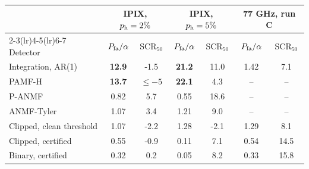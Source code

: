 \begin{tabular}{lcccccc}
\toprule
 & \multicolumn{2}{c}{IPIX, $p_{\rm h}=2\%$} & \multicolumn{2}{c}{IPIX, $p_{\rm h}=5\%$} & \multicolumn{2}{c}{77 GHz, run C}\\
\cmidrule(lr){2-3}\cmidrule(lr){4-5}\cmidrule(lr){6-7}
 Detector & $P_{\rm fa}/\alpha$ & SCR$_{50}$ & $P_{\rm fa}/\alpha$ & SCR$_{50}$ & $P_{\rm fa}/\alpha$ & SCR$_{50}$\\
\midrule
Integration, AR(1) & \textbf{12.9} & -1.5 & \textbf{21.2} & 11.0 & 1.42 & 7.1\\
PAMF-H & \textbf{13.7} & $\le-5$ & \textbf{22.1} & 4.3 & -- & --\\
P-ANMF & 0.82 & 5.7 & 0.55 & 18.6 & -- & --\\
ANMF-Tyler & 1.07 & 3.4 & 1.21 & 9.0 & -- & --\\
Clipped, clean threshold & 1.07 & -2.2 & 1.28 & -2.1 & 1.29 & 8.1\\
Clipped, certified & 0.55 & -0.9 & 0.11 & 7.1 & 0.54 & 14.5\\
Binary, certified & 0.32 & 0.2 & 0.05 & 8.2 & 0.33 & 15.8\\
\bottomrule
\end{tabular}

